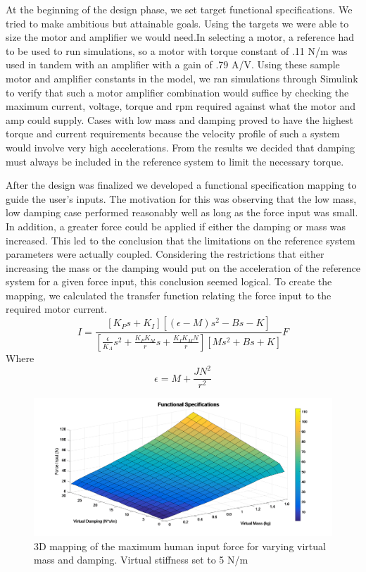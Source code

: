 At the beginning of the design phase, we set target functional specifications. We tried to make ambitious but attainable goals. Using the targets we were able to size the motor and amplifier we would need.In selecting a motor, a reference had to be used to run simulations, so a motor with torque constant of .11 N/m was used in tandem with an amplifier with a gain of .79 A/V. Using these sample motor and amplifier constants in the model, we ran simulations through Simulink to verify that such a motor amplifier combination would suffice by checking the maximum current, voltage, torque and rpm required against what the motor and amp could supply. Cases with low mass and damping proved to have the highest torque and current requirements because the velocity profile of such a system would involve very high accelerations. From the results we decided that damping must always be included in the reference system to limit the necessary torque.

After the design was finalized we developed a functional specification mapping to guide the user's inputs. The motivation for this was observing that the low mass, low damping case performed reasonably well as long as the force input was small. In addition, a greater force could be applied if either the damping or mass was increased. This led to the conclusion that the limitations on the reference system parameters were actually coupled. Considering the restrictions that either increasing the mass or the damping would put on the acceleration of the reference system for a given force input, this conclusion seemed logical. To create the mapping, we calculated the transfer function relating the force input to the required motor current.\begin{equation}
I = \frac{[K_{P}s+K_{I}][(\epsilon-M)s^{2}-Bs-K]}{[\frac{\epsilon}{K_{A}}s^{2}+\frac{K_{P}K_{M}}{r}s+\frac{K_{I}K_{M}N}{r}][Ms^{2}+Bs+K]}F
\end{equation}
Where 
\begin{equation}
\epsilon = M+\frac{JN^{2}}{r^{2}}
\end{equation}

\begin{figure}[th]
\centering
\includegraphics[width=1\linewidth]{Images/Functional_Specifications_Mapping}
\caption{3D mapping of the maximum human input force for varying virtual mass and damping. Virtual stiffness set to 5 N/m}
\label{fig:Functional_Specifications_Mapping}
\end{figure}

